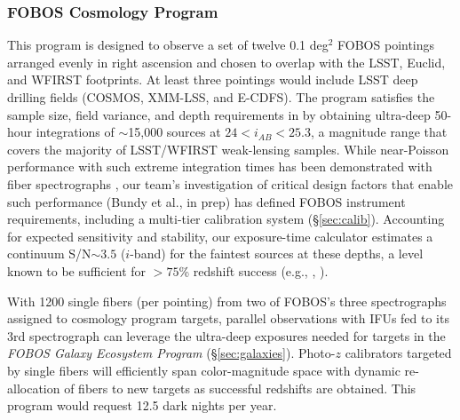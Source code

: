 \documentclass[11pt,a4paper,twoside,onecolumn,openany,final,oldfontcommands]{memoir}
\begin{document}
\subsubsection{FOBOS Cosmology Program}
This program is designed to observe a set of twelve 0.1 deg$^2$ FOBOS pointings arranged evenly in right ascension and chosen to overlap with the LSST, Euclid, and WFIRST footprints.  At least three pointings would include LSST deep drilling fields (COSMOS, XMM-LSS, and E-CDFS).  The program satisfies the sample size, field variance, and depth requirements in \citet{newman15} by obtaining ultra-deep 50-hour integrations of $\sim$15,000 sources at $24 < i_{AB} < 25.3$, a magnitude range that covers the majority of LSST/WFIRST weak-lensing samples.  While near-Poisson performance with such extreme integration times has been demonstrated with fiber spectrographs \citep[e.g.,][]{gu17,childress17}, our team's investigation of critical design factors that enable such performance (Bundy et al., in prep) has defined FOBOS instrument requirements, including a multi-tier calibration system (\S \ref{sec:calib}).  Accounting for expected sensitivity and stability, our exposure-time calculator estimates a continuum S/N$\sim3.5$ ($i$-band) for the faintest sources at these depths, a level known to be sufficient for $>75$\% redshift success (e.g., \citealp{Newman13}, \citealp{masters19}). 

With 1200 single fibers (per pointing) from two of FOBOS's three spectrographs assigned to cosmology program targets, parallel observations with IFUs fed to its 3rd spectrograph can leverage the ultra-deep exposures needed for targets in the {\it FOBOS Galaxy Ecosystem Program} (\S \ref{sec:galaxies}).  Photo-$z$ calibrators targeted by single fibers will efficiently span color-magnitude space \citep{masters15, masters19} with dynamic re-allocation of fibers to new targets as successful redshifts are obtained.  This program would request 12.5 dark nights per year.

  
\end{document}
